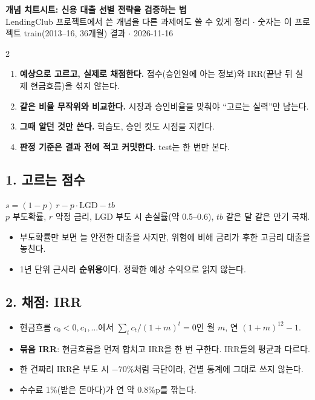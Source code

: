 \documentclass[10pt]{report}
\begin{document}
\begin{center}{\Large\bfseries 개념 치트시트: 신용 대출 선별 전략을 검증하는 법}\\[2pt]
{\footnotesize LendingClub 프로젝트에서 쓴 개념을 다른 과제에도 쓸 수 있게 정리 \ensuremath{\cdot} 숫자는 이 프로젝트 train(2013--16, 36개월) 결과 \ensuremath{\cdot} 2026-11-16}\end{center}
\raggedcolumns
\titlespacing*{\subsection}{0pt}{6pt}{2pt}
\begin{multicols}{2}\raggedright\small

\begin{keybox}[딱 이것만]
\begin{enumerate}
\item \textbf{예상으로 고르고, 실제로 채점한다.} 점수(승인일에 아는 정보)와 IRR(끝난 뒤 실제 현금흐름)을 섞지 않는다.
\item \textbf{같은 비율 무작위와 비교한다.} 시장과 승인비율을 맞춰야 ``고르는 실력''만 남는다.
\item \textbf{그때 알던 것만 쓴다.} 학습도, 승인 컷도 시점을 지킨다.
\item \textbf{판정 기준은 결과 전에 적고 커밋한다.} test는 한 번만 본다.
\end{enumerate}
\end{keybox}

\subsection*{1. 고르는 점수}
\begin{formulabox}[기대수익 점수]
$s=(1-p)\,r-p\cdot\mathrm{LGD}-tb$\\
$p$ 부도확률, $r$ 약정 금리, LGD 부도 시 손실률(약 0.5--0.6), $tb$ 같은 달 같은 만기 국채.
\end{formulabox}
\begin{itemize}
\item 부도확률만 보면 늘 안전한 대출을 사지만, 위험에 비해 금리가 후한 고금리 대출을 놓친다.
\item 1년 단위 근사라 \textbf{순위용}이다. 정확한 예상 수익으로 읽지 않는다.
\end{itemize}

\subsection*{2. 채점: IRR}
\begin{itemize}
\item 현금흐름 $c_0<0, c_1, \ldots$에서 $\sum_t c_t/(1+m)^t=0$인 월 $m$, 연 $(1+m)^{12}-1$.
\item \textbf{묶음 IRR}: 현금흐름을 먼저 합치고 IRR을 한 번 구한다. IRR들의 평균과 다르다.
\item 한 건짜리 IRR은 부도 시 $-70\%$처럼 극단이라, 건별 통계에 그대로 쓰지 않는다.
\item 수수료 1\%(받은 돈마다)가 연 약 0.8\%p를 깎는다.
\end{itemize}


\end{multicols}
\end{document}
